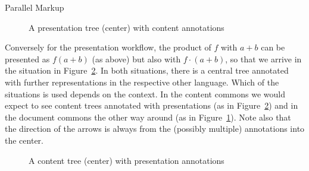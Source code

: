 \begin{omgroup}[id=mobj,short=Mathematical Objects]
\begin{omgroup}{Parallel Markup}
\begin{figure}[ht]\centering
{}
\caption{A presentation tree (center) with content annotations}\label{fig:ptree-parallel}
\end{figure}

Conversely for the presentation workflow, the product of $f$ with $a+b$ can be presented
as $f(a+b)$ (as above) but also with $f\cdot(a+b)$, so that we arrive in the situation in
Figure~\ref{fig:ctree-parallel}.  In both situations, there is a central tree annotated
with further representations in the respective other language. Which of the situations is
used depends on the context. In the content commons we would expect to see content trees
annotated with presentations (as in Figure~\ref{fig:ctree-parallel}) and in the document
commons the other way around (as in Figure~\ref{fig:ptree-parallel}). Note also that the
direction of the arrows is always from the (possibly multiple) annotations into the
center.

\begin{figure}[ht]\centering
{}
\caption{A content tree (center) with presentation annotations}\label{fig:ctree-parallel}
\end{figure}
\end{omgroup}


\end{omgroup}
